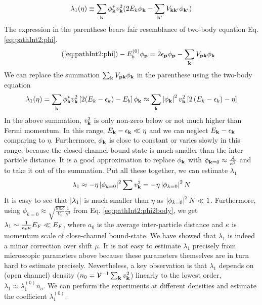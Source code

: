 \begin{equation*}
\lambda_{1}(\eta)\equiv\sum_{\mathbf{k}}{\phi_{\mathbf{k}}^{*}}v_{\mathbf{k}}^{2}(2E_{k}\phi_{\mathbf{k}}-\sum_{\mathbf{k}'}V_{\mathbf{k}\mathbf{k}'}\phi_{\mathbf{k}'})
\end{equation*}
The expression in the parenthese bears fair resemblance of two-body \sch equation Eq. \ref{eq:pathInt2:phi}.  
\begin{equation}\tag{\ref{eq:pathInt2:phi}}
-E_{b}^{(0)}\phi_{\vp}=2\epsilon_{\vp}\phi_{\vp}-\sum_{\vk}V_{\vp\vk} \phi_{\vk}
\end{equation}
We can replace the summation $\sum_{\mathbf{k}}V_{\mathbf{p}\mathbf{k}} \phi_{\mathbf{k}}$ in the parenthese using the two-body \sch equation
\begin{equation*}
\lambda_{1}(\eta)=\sum_{\mathbf{k}}{\phi_{\mathbf{k}}^{*}}v_{\mathbf{k}}^{2}\left[2(E_{k}-\epsilon_{k})-E_b\right]\phi_{\mathbf{k}}
	\approx\sum_{\mathbf{k}}\left\lvert{\phi_{\ensuremath{\mathbf{k}}}}\right\rvert^2v_{\mathbf{k}}^{2}\left[2\left(E_{k}-\epsilon_{k}\right)-\eta\right]
\end{equation*}
In the above summation, $v_{\mathbf{k}}^2$ is only non-zero below or not much higher than Fermi momentum.  In this range, $E_{\mathbf{k}}-\epsilon_{\mathbf{k}}\ll\eta$ and we can neglect $E_{\mathbf{k}}-\epsilon_{\mathbf{k}}$ comparing to $\eta$.  
Furthermore, $\phi_{\mathbf{k}}$ is close to constant or varies slowly in this range, because the closed-channel bound state is much smaller than the inter-particle distance.    It is a good approximation to replace $\phi_{\mathbf{k}}$ with $\phi_{\mathbf{k}=0}\approx\frac{A}{\kappa^{2}}$ and to take it out of the summation.  
Put all these together, we can estimate $\lambda_{1}$ 
\begin{equation}
\lambda_{1}\approx-\eta\left\lvert{\phi_{k=0}}\right\rvert^2\sum{}v_{\mathbf{k}}^{2}=-\eta\left\lvert{\phi_{k=0}}\right\rvert^2N	
\end{equation}
It is easy to see that $\left\lvert{\lambda_{1}}\right\rvert$ is much smaller than $\eta$ as $\left\lvert{\phi_{k=0}}\right\rvert^2N\ll1$.  Furthermore, using $\phi_{k=0}\approx\sqrt{\frac{8\pi\kappa}{V_{0}}}\frac{1}{\kappa^{2}}$ from Eq. \ref{eq:pathInt2:phi2body}, we get $\lambda_{1}\sim\frac{1}{a_{0}\kappa}E_{F}\ll{}E_{F}$, where $a_{0}$ is the average inter-particle distance and $\kappa$ is momentum scale of close-channel bound-state.   We have showed that $\lambda_{1}$ is indeed a minor correction over shift $\mu$.
It is not easy to estimate $\lambda_{1}$ precisely from  microscopic parameters above because these parameters themselves are  in turn hard to  estimate precisely.  Nevertheless, a key observation is that $\lambda_1$ depends on (open channel) density ($n_{0}={\mathcal{V}^{-1}}\sum_{\mathbf{k}}v_{\mathbf{k}}^2$) linearly to the lowest order, $\lambda_1\approx\lambda_1^{(0)}n_{o}$.  We can perform the experiments at different densities and estimate the coefficient $\lambda_1^{(0)}$. 


